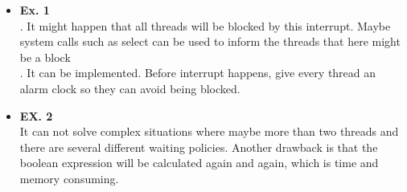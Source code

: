 \documentclass{article}
\begin{document}
\begin{itemize}
\item {\bf Ex. 1}\\
{. It might happen that all threads will be blocked by this interrupt. Maybe system calls such as select can be used to inform the threads that here might be a block}\\ 

{. It can be implemented. Before interrupt happens, give every thread an alarm clock so they can avoid being blocked.}


\item {\bf EX. 2}\\

{\noindent It can not solve complex situations where maybe more than two threads and there are several different waiting policies. Another drawback is that the boolean expression will be calculated again and again, which is time and memory consuming.}


\end{itemize}
\end{document}
